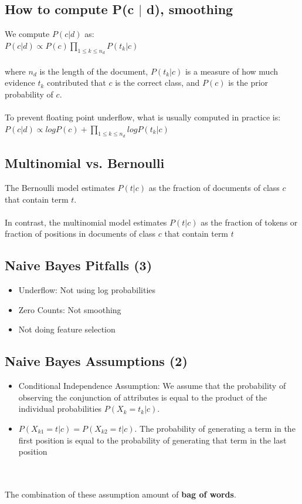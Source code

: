 \documentclass{article}%
\begin{document}
\subsection*{How to compute P(c $\vert$ d), smoothing}
We compute $P(c | d)$ as: \\

$P(c | d) \propto P(c) \prod \limits_{1 \leq k \leq n_d} P(t_k | c)$\\
\\
where $n_d$ is the length of the document, $P(t_k | c)$ is a measure of how much evidence $t_k$ contributed that $c$ is the correct class,
and $P(c)$ is the prior probability of $c$.\\
\vspace{2mm}\\
To prevent floating point underflow, what is usually computed in practice is:\\

$P(c | d) \propto logP(c) + \prod \limits_{1 \leq k \leq n_d} log P(t_k | c)$
\subsection*{Multinomial vs. Bernoulli}
The Bernoulli model estimates  $P(t | c)$ as the fraction of documents of class $c$ that contain term $t$.\\
\\
In contrast, the multinomial model estimates  $P(t | c)$ as the fraction of tokens or fraction of positions in documents of class $c$ that contain term $t$
\subsection*{Naive Bayes Pitfalls (3)}
\begin{itemize}
    \item Underflow: Not using log probabilities
    \item Zero Counts: Not smoothing
    \item Not doing feature selection
\end{itemize}
\subsection*{Naive Bayes Assumptions (2)}
\begin{itemize}
    \item Conditional Independence Assumption: We assume that the probability of observing the conjunction of attributes is equal
        to the product of the individual probabilities $P(X_k = t_k|c)$.
    \item $P(X_{k1} = t | c) = P(X_{k2} = t | c)$. The probability of generating a term in the first position is equal to the
        probability of generating that term in the last position
\end{itemize}\\
\\
The combination of these assumption amount of \textbf{bag of words}.
\end{document}
